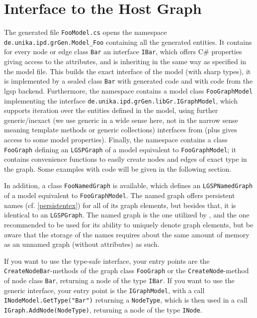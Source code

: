 \section{Interface to the Host Graph}

The generated file \texttt{FooModel.cs} opens the namespace \texttt{de.unika.ipd.grGen.Model\_Foo} containing all the generated entities.
It contains for every node or edge class \texttt{Bar} an interface \texttt{IBar}, which offers C\# properties giving access to the attributes, and is inheriting in the same way as specified in the model file.
This builds the exact interface of the model (with sharp types), it is implemented by a sealed class \texttt{Bar} with generated code and with code from the lgsp backend.
Furthermore, the namespace contains a model class \texttt{FooGraphModel} implementing the interface \texttt{de.unika.ipd.grGen.libGr.IGraphModel},
which supports iteration over the entities defined in the model, using further generic/inexact (we use generic in a wide sense here, not in the narrow sense meaning template methods or generic collections) interfaces from \LibGr{} (plus gives access to some model properties).
Finally, the namespace contains a class \texttt{FooGraph} defining an \texttt{LGSPGraph} of a model equivalent to \texttt{FooGraphModel}; 
it contains convenience functions to easily create nodes and edges of exact type in the graph.
Some examples with code will be given in the following section.

In addition, a class \texttt{FooNamedGraph} is available, which defines an \texttt{LGSPNamedGraph} of a model equivalent to \texttt{FooGraphModel}.
The named graph offers persistent names (cf. \ref{persistentex}) for all of its graph elements, but besides that, it is identical to an \texttt{LGSPGraph}. %
The named graph is the one utilized by \GrShell, and the one recommended to be used for its ability to uniquely denote graph elements,
but be aware that the storage of the names requires about the same amount of memory as an unnamed graph (without attributes) as such.

\begin{note}
If you want to use the type-safe interface, your entry points are the \texttt{CreateNodeBar}-methods of the graph class \texttt{FooGraph} or the \texttt{CreateNode}-method of node class \texttt{Bar}, returning a node of the type \texttt{IBar}.
If you want to use the generic interface, your entry point is the \texttt{IGraphModel}, with a call \texttt{INodeModel.GetType("Bar")} returning a \texttt{NodeType}, which is then used in a call \texttt{IGraph.AddNode(NodeType)}, returning a node of the type \texttt{INode}.
\end{note}

